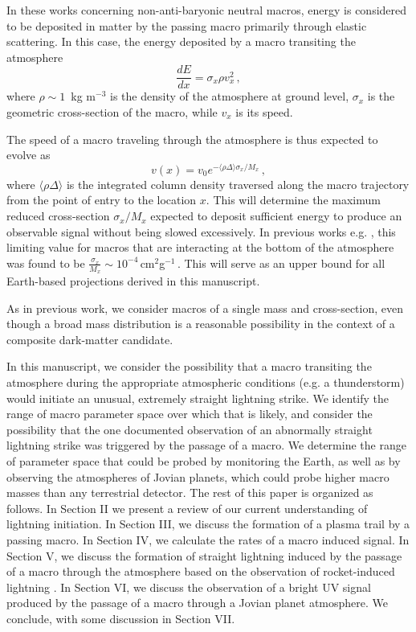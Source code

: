 \documentclass[%
 reprint,
 amsmath,amssymb,
 aps,
]{revtex4-2}
\begin{document}
    In these works concerning non-anti-baryonic neutral macros,  energy is considered to be  deposited in matter by the passing macro  primarily through elastic scattering. In this case, the energy deposited by a macro transiting the atmosphere 
    \begin{equation}\label{eq:dedx}
        \frac{dE}{dx} = \sigma_x \rho v_x^2\,,
    \end{equation}
    where $\rho \sim 1\,$ kg m$^{-3}$ is the density of the atmosphere at ground level, $\sigma_x$ is the geometric cross-section of the macro,  while $v_x$ is its speed.
    
    The speed of a macro traveling through the atmosphere is thus expected to evolve as
    \begin{equation}\label{eq:atmo_velocity}
        v(x) = v_{0} e^{-\langle \rho \Delta\rangle \sigma_x/{M_x}}\,,
    \end{equation}
    where $\langle \rho \Delta\rangle$ is the integrated column density traversed along the macro trajectory from the point of entry to the location $x$. This will determine the maximum reduced cross-section $\sigma_x/M_x$ expected to deposit sufficient energy to produce an observable signal without being slowed excessively. In previous works e.g. \cite{Sidhu2019death, Sidhu2019bolide}, this limiting value for macros that are interacting at the bottom of the atmosphere was found to be $\frac{\sigma_x}{M_x} \sim 10^{-4}\,$cm$^2$g$^{-1}\,$. This will serve as an upper bound for all Earth-based projections derived in this manuscript.

    As in previous work, we consider macros of a single mass and cross-section, even though a broad mass distribution is a reasonable possibility in the context of a composite dark-matter candidate.

    In this manuscript, we consider the possibility that a macro transiting the atmosphere during the appropriate atmospheric conditions (e.g. a thunderstorm) would initiate an unusual, extremely straight lightning strike. We identify the range of macro parameter space over which that is likely, and consider the possibility that the one documented observation of an abnormally straight lightning strike was triggered by the passage of a macro.  We determine the range of parameter space that could be probed by monitoring the Earth, as well as by observing the atmospheres of Jovian planets, which could probe higher macro masses than any terrestrial detector. The rest of this paper is organized as follows. In Section II we present a review of our current understanding of lightning initiation. In Section III, we discuss the formation of a plasma trail by a passing macro. In Section IV, we calculate the rates of a macro induced signal. In Section V, we discuss the formation of straight lightning induced by the passage of a macro through the atmosphere based on the observation of rocket-induced lightning \cite{Wang1999, rocket2012, Hill2012, Hill2013}. In Section VI, we discuss the observation of a bright UV signal produced by the passage of a macro through a Jovian planet atmosphere. We conclude, with some discussion in Section VII.
    
\end{document}
